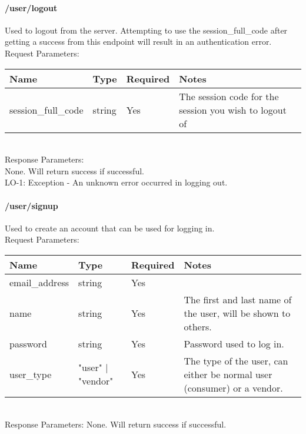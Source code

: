 \documentclass{article}[11pt]
\begin{document}
\paragraph{/user/logout}\textbf{}

Used to logout from the server. Attempting to use the session\_full\_code after getting a success from this endpoint will result in an authentication error.  \\

\noindent
Request Parameters:

\noindent
\begin{tabular}{|l|l|l|l|}
\hline
\textbf{Name} & \textbf{Type} & \textbf{Required} & \textbf{Notes} \\
\hline
session\_full\_code & string & Yes & The session code for the session you wish to logout of \\
\hline
\end{tabular} \\

\noindent
Response Parameters: \\
None. Will return success if successful. \\

\ErrorsSession
LO-1: Exception - An unknown error occurred in logging out.


\paragraph{/user/signup}\textbf{}

Used to create an account that can be used for logging in.  \\

\noindent
Request Parameters:

\noindent
\begin{tabular}{|l|l|l|l|}
\hline
\textbf{Name} & \textbf{Type} & \textbf{Required} & \textbf{Notes} \\
\hline
email\_address & string & Yes & \\
\hline
name & string & Yes & The first and last name of the user, will be shown to others. \\
\hline
password & string & Yes & Password used to log in. \\
\hline
user\_type & "user" | "vendor" & Yes & The type of the user, can either be normal user (consumer) or a vendor. \\
\hline
\end{tabular} \\

\noindent
Response Parameters:
None. Will return success if successful.
\end{document}
